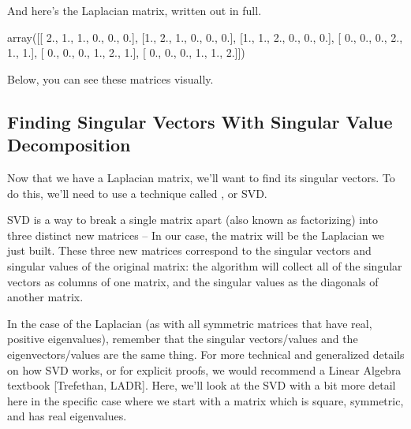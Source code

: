 \documentclass[letterpaper,10pt,english]{jupyterBook}
\begin{document}
\sphinxAtStartPar
And here’s the Laplacian matrix, written out in full.

\begin{sphinxVerbatim}[commandchars=\\\{\}]
  
\end{sphinxVerbatim}

\begin{sphinxVerbatim}[commandchars=\\\{\}]
array([[ 2., \PYGZhy{}1., \PYGZhy{}1.,  0.,  0.,  0.],
       [\PYGZhy{}1.,  2., \PYGZhy{}1.,  0.,  0.,  0.],
       [\PYGZhy{}1., \PYGZhy{}1.,  2.,  0.,  0.,  0.],
       [ 0.,  0.,  0.,  2., \PYGZhy{}1., \PYGZhy{}1.],
       [ 0.,  0.,  0., \PYGZhy{}1.,  2., \PYGZhy{}1.],
       [ 0.,  0.,  0., \PYGZhy{}1., \PYGZhy{}1.,  2.]])
\end{sphinxVerbatim}

\sphinxAtStartPar
Below, you can see these matrices visually.

\noindent{}


\subsection{Finding Singular Vectors With Singular Value Decomposition}
\label{\detokenize{representations/ch6/spectral-embedding:finding-singular-vectors-with-singular-value-decomposition}}
\sphinxAtStartPar
Now that we have a Laplacian matrix, we’ll want to find its singular vectors. To do this, we’ll need to use a technique called , or SVD.

\sphinxAtStartPar
SVD is a way to break a single matrix apart (also known as factorizing) into three distinct new matrices – In our case, the matrix will be the Laplacian we just built. These three new matrices correspond to the singular vectors and singular values of the original matrix: the algorithm will collect all of the singular vectors as columns of one matrix, and the singular values as the diagonals of another matrix.

\sphinxAtStartPar
In the case of the Laplacian (as with all symmetric matrices that have real, positive eigenvalues), remember that the singular vectors/values and the eigenvectors/values are the same thing. For more technical and generalized details on how SVD works, or for explicit proofs, we would recommend a Linear Algebra textbook {[}Trefethan, LADR{]}. Here, we’ll look at the SVD with a bit more detail here in the specific case where we start with a matrix which is square, symmetric, and has real eigenvalues.
\end{document}

